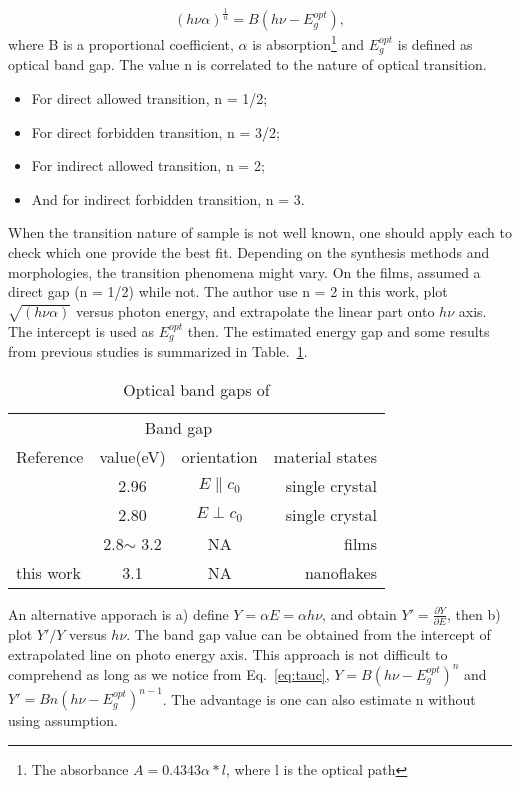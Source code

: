 \begin{equation}\label{eq:tauc}
 (h\nu \alpha)^{\frac{1}{n}} = B(h\nu - E_g^{opt}),
\end{equation}
where B is a proportional coefficient, $\alpha$ is absorption\footnote{The absorbance $A = 0.4343\alpha*l$, where l is the optical path} and $E_g^{opt}$ is defined as optical band gap. The value n is correlated to the nature of optical transition.
\begin{itemize}
\item For direct allowed transition, n = 1/2;
\item For direct forbidden transition, n = 3/2;
\item For indirect allowed transition, n = 2;
\item And for indirect forbidden transition, n = 3.
\end{itemize}

When the transition nature of sample is not well known, one should apply each to check which one provide the best fit. Depending on the synthesis methods and  morphologies, the transition phenomena might vary. On the  films, \citeauthor{Bouzidi2003} assumed a direct gap (n = 1/2)\cite{Bouzidi2003} while \citeauthor{Szekeres2002} not.\cite{Szekeres2002} The author use n = 2 in this work, plot $\sqrt{(h\nu \alpha)}$ versus photon energy, and extrapolate the linear part onto $h\nu$ axis. The intercept is used as $E_g^{opt}$ then. The estimated energy gap and some results from previous studies is summarized in Table.~\ref{tab:mobg}.

\begin{table}[htb]
\centering
\caption{Optical band gaps of }\label{tab:mobg}
\begin{tabular}{lccr}
\toprule
&\multicolumn{2}{c}{Band gap} \\
\cmidrule(l){2-3}
Reference & value(eV) & orientation & material states\\
\midrule
\cite{Deb1968}   & 2.96  & $E\parallel c_0$ & single crystal\\
\cite{Deb1968}   & 2.80  & $E\perp c_0$ & single crystal \\
\cite{Julien1995} & 2.8$\sim$ 3.2 & NA & films\\
 this work  & 3.1  & NA & nanoflakes\\
\bottomrule
\end{tabular}
\end{table}

An alternative apporach is a) define $Y = \alpha E=\alpha h\nu$, and obtain $Y' = \frac{\partial Y}{\partial E}$, then b) plot $Y'/Y$ versus $h\nu$. The band gap value can be obtained from the intercept of extrapolated line on photo energy axis.\cite{Choopun} This approach is not difficult to comprehend as long as we notice from Eq.~\ref{eq:tauc}, $Y = B (h\nu - E_g^{opt})^n$ and $Y' = B n(h\nu - E_g^{opt})^{n-1}$. The advantage is one can also estimate n without using assumption.

